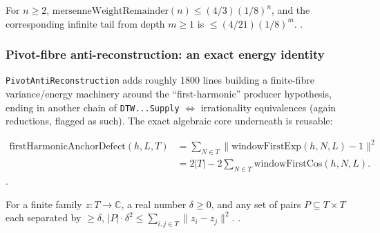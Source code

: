 \begin{prop}
For $n\ge 2$, $\mathrm{mersenneWeightRemainder}(n) \le (4/3)(1/8)^n$, and the
corresponding infinite tail from depth $m\ge 1$ is $\le (4/21)(1/8)^m$.
\quad {}
\quad {} \quad {} \quad {}.
\end{prop}

\subsubsection{Pivot-fibre anti-reconstruction: an exact energy identity}

\texttt{PivotAntiReconstruction} adds roughly 1800 lines building a
finite-fibre variance/energy machinery around the ``first-harmonic''
producer hypothesis, ending in another chain of \texttt{DTW...Supply}
$\Leftrightarrow$ irrationality equivalences (again reductions, flagged as
such). The exact algebraic core underneath is reusable:

\begin{prop}
\[
\begin{aligned}
\mathrm{firstHarmonicAnchorDefect}(h,L,T)
  &= \sum_{N\in T}\|\mathrm{windowFirstExp}(h,N,L)-1\|^2 \\
  &= 2|T|-2\sum_{N\in T}\mathrm{windowFirstCos}(h,N,L).
\end{aligned}
\]
\quad {}
\quad {} \quad {} \quad {}.
\end{prop}

\begin{lem}
For a finite family $z:T\to\mathbb{C}$, a real number $\delta\ge0$, and any set of pairs $P\subseteq
T\times T$ each separated by $\ge\delta$, $|P|\cdot\delta^2 \le
\sum_{i,j\in T}\|z_i-z_j\|^2$.
\quad {} \quad {} \quad {}.
\end{lem}

